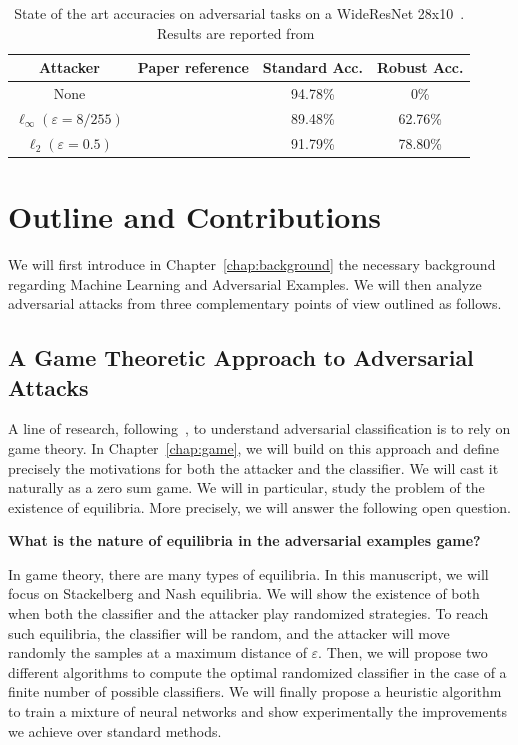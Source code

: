 \begin{table}[ht]
    \centering
    \begin{tabular}{c|c|c|c}
       \textbf{Attacker}  &  \textbf{Paper reference} & \textbf{Standard Acc.} & \textbf{Robust Acc.}  \\ \hline
        None & \citep{ZagoruykoK16} & 94.78\% & 0\%\\
        $\ell_\infty (\varepsilon=8/255)$&  \citep{rebuffi2021fixing}& 89.48\% & 62.76\%\\
        $\ell_2 (\varepsilon=0.5)$&  \citep{rebuffi2021fixing}& 91.79\% & 78.80\%\\
    \end{tabular}
    \caption{State of the art accuracies on adversarial tasks on a WideResNet 28x10~\citep{ZagoruykoK16}. Results are reported from~\citep{croce2020robustbench}}
\label{table:sota-cifar}
\end{table}

\section{Outline and Contributions}
We will first introduce in Chapter~\ref{chap:background} the necessary  background regarding Machine Learning and Adversarial Examples. We will then analyze  adversarial attacks from three complementary points of view outlined as follows.
\subsection{A Game Theoretic Approach to Adversarial Attacks}

A line of research, following~\cite{pinot2020randomization}, to understand adversarial classification is to rely on game theory. In Chapter~\ref{chap:game},  we will build on this approach and define precisely the motivations for both the attacker and the classifier. We will cast it naturally as a zero sum game. We will in particular, study the problem  of the existence of equilibria. More precisely, we will answer the following open question.
\medskip
\begin{tcolorbox}[title=Question 1]
\textbf{What is the nature of equilibria in the adversarial examples game?}
\end{tcolorbox}
\medskip

In game theory, there are many types of equilibria. In this manuscript, we will focus on Stackelberg and Nash equilibria. We will show the existence of both when both the classifier and the attacker play randomized strategies. To reach such equilibria, the classifier will be random, and the attacker will move randomly the samples at a maximum distance of $\varepsilon$. Then, we will propose two different algorithms to compute the optimal randomized classifier in the case of a finite number of possible classifiers. We will finally propose a heuristic algorithm to train a mixture of neural networks and show experimentally the improvements we achieve over standard methods.

